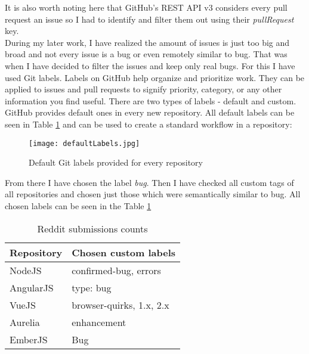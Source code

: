 It is also worth noting here that GitHub's REST API v3 considers every pull request an issue so I had to identify and filter them out using their \textit{pullRequest} key.\\
During my later work, I have realized the amount of issues is just too big and broad and not every issue is a bug or even remotely similar to bug. That was when I have decided to filter the issues and keep only real bugs. For this I have used Git labels. Labels on GitHub help organize and prioritize work. They can be applied to issues and pull requests to signify priority, category, or any other information you find useful. There are two types of labels - default and custom. GitHub provides default ones in every new repository. All default labels can be seen in Table \ref{fig:defaultLabels} and can be used to create a standard workflow in a repository:

\begin{figure}[H]%
    \centering
	\texttt{[image: defaultLabels.jpg]}
    \caption{Default Git labels provided for every repository}%
    \label{fig:defaultLabels}%
\end{figure}

From there I have chosen the label \textit{bug}. Then I have checked all custom tags of all repositories and chosen just those which were semantically similar to bug. All chosen labels can be seen in the Table \ref{table:allGitBugLabels}


\begin{table}[H]
\centering
\begin{tabular}{ |p{3cm}||p{6cm}|}
 \hline
\textbf{ Repository }& \textbf{Chosen custom labels}\\
 \hline
 NodeJS   & confirmed-bug, errors \\ \hline
 AngularJS &   type: bug \\ \hline
 VueJS & browser-quirks, 1.x, 2.x\\ \hline
 Aurelia & enhancement\\ \hline
 EmberJS & Bug\\ \hline
\end{tabular}
\caption{Reddit submissions counts}
\label{table:allGitBugLabels}
\end{table}
